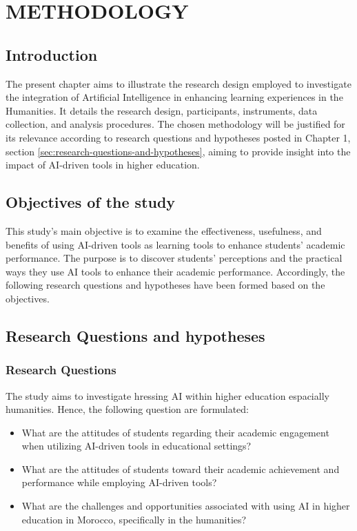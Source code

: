 \chapter{METHODOLOGY}
\section{Introduction}
The present chapter aims to illustrate the research design employed
to investigate the integration of Artificial Intelligence in enhancing
learning experiences in the Humanities. It details the research design,
participants, instruments, data collection, and analysis procedures.
The chosen methodology will be justified for its relevance according to
research questions and hypotheses posted in Chapter 1, section \ref{sec:research-questions-and-hypotheses},
aiming to provide insight into the impact of AI-driven tools in higher education.

\section{Objectives of the study}
This study's main objective is to examine the effectiveness, usefulness,
and benefits of using AI-driven tools as learning tools to enhance students’
academic performance. The purpose is to discover students’ perceptions and
the practical ways they use AI tools to enhance their academic performance.
Accordingly, the following research questions and hypotheses have been
formed based on the objectives.
\section{Research Questions and hypotheses}
\subsection{Research Questions}
The study aims to investigate hressing AI within higher education espacially humanities. Hence,
the following question are formulated:
\begin{itemize}
	\item What are the attitudes of students regarding their academic engagement when utilizing AI-driven tools in educational settings?
	\item What are the attitudes of students toward their academic achievement and performance while employing AI-driven tools?
	\item What are the challenges and opportunities associated
	      with using AI in higher education in Morocco,
	      specifically in the humanities?
\end{itemize}

